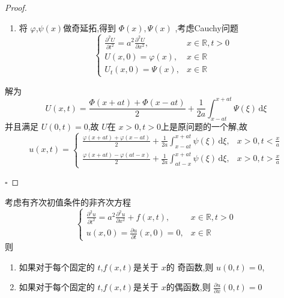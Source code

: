 \documentclass[../../PDE.tex]{subfiles}
\begin{document}
\hspace*{\fill} 
\begin{proof}
    \begin{enumerate}
        \item 将 \(   \varphi   \),\(  \psi \left( x \right)   \)做奇延拓,得到 \(  \Phi \left( x \right),\Psi \left( x \right)    \)   ,考虑Cauchy问题 \[
        \begin{cases} \frac{\partial ^{2}U}{\partial t^{2}}= a^{2}\frac{\partial ^{2}U}{\partial x^{2}},& x \in \mathbb{R} ,t> 0\\ 
         U\left( x,0 \right)=  \varphi \left( x \right),&x\in \mathbb{R} \\ 
          U_{t}\left( x,0 \right)= \Psi \left( x \right),& x \in \mathbb{R}      \end{cases} 
        \]
    \end{enumerate}
    解为  \[
    U\left( x,t \right)= \frac{\Phi \left( x+ at \right)+ \Phi \left( x-at \right)   }{2 }+ \frac{1 }{2a }\int_{x-at}^{x+ at}\Psi \left(  \xi  \right)\,\mathrm{d}  \xi     
    \]并且满足 \(  U\left( 0,t \right)= 0   \),故 \(  U  \)在 \(  x> 0,t> 0  \)上是原问题的一个解,故 \[
    u\left( x,t \right)= \begin{cases} \frac{ \varphi \left( x+ at \right)+  \varphi \left( x-at \right)   }{2 }+ \frac{1 }{2a }\int_{x-at}^{x+ at}\psi \left(  \xi  \right)\,\mathrm{d}  \xi ,&x> 0,t< \frac{x }{a }\\ 
     \frac{ \varphi \left( x+ at \right)- \varphi \left( at-x \right)   }{2 }+ \frac{1 }{2a }\int_{at-x}^{x+ at}\psi \left(  \xi  \right)\,\mathrm{d}  \xi ,&x> 0,t> \frac{x }{a }         \end{cases}  
    \]   

    \hfill $\square$
\end{proof}


\begin{proposition}
    考虑有齐次初值条件的非齐次方程 
    \[
    \begin{cases} \frac{\partial ^{2}u}{\partial t^{2}}= a^{2}\frac{\partial ^{2}u}{\partial x^{2}}+ f\left( x,t \right),& x \in \mathbb{R} ,t> 0\\ 
     u\left( x,0 \right)= \frac{\partial u}{\partial t}\left( x,0 \right)= 0,& x \in \mathbb{R}     \end{cases} 
    \]则
    \begin{enumerate}
        \item 如果对于每个固定的 \(  t  \),\(  f\left( x,t \right)   \)是关于 \(  x  \)的 奇函数,则 \(  u\left( 0,t \right)= 0   \),
        \item 如果对于每个固定的 \(  t  \),\(  f\left( x,t \right)   \)是关于 \(  x  \)的偶函数,则 \(  \frac{\partial u}{\partial x}\left( 0,t \right)= 0   \)       
    \end{enumerate}
    
\end{proposition}
\end{document}
